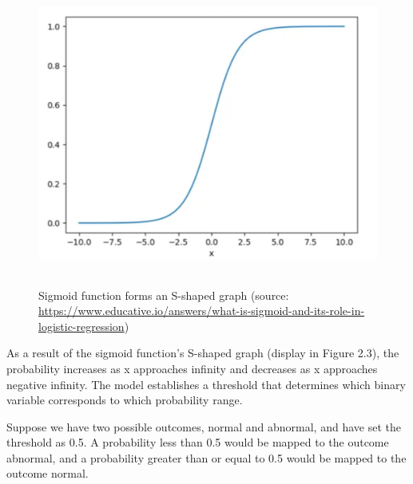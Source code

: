 \begin{figure}[h!]
	\centering
	\includegraphics[width=\linewidth, height=10cm,keepaspectratio]{figures/sigmoid.PNG}
	\caption{Sigmoid function forms an S-shaped graph (source: \url{https://www.educative.io/answers/what-is-sigmoid-and-its-role-in-logistic-regression})}
\end{figure}

\newpage
As a result of the sigmoid function's S-shaped graph (display in Figure 2.3), the probability increases as x approaches infinity and decreases as x approaches negative infinity. The model establishes a threshold that determines which binary variable corresponds to which probability range.

Suppose we have two possible outcomes, normal and abnormal, and have set the threshold as 0.5. A probability less than 0.5 would be mapped to the outcome abnormal, and a probability greater than or equal to 0.5 would be mapped to the outcome normal.

